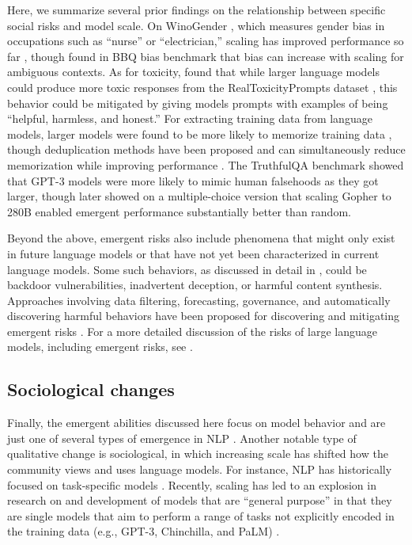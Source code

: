 \documentclass[10pt]{article} %
\begin{document}
Here, we summarize several prior findings on the relationship between specific social risks and model scale.
On WinoGender \citep{rudinger-etal-2017-social}, which measures gender bias in occupations such as ``nurse'' or ``electrician,'' scaling has improved performance so far \citep{du2021glam,chowdhery2022palm}, though \citet{bigbench} found in BBQ bias benchmark \citep{parrish-etal-2022-bbq} that bias can increase with scaling for ambiguous contexts.
As for toxicity, \citet{askell2021general} found that while larger language models could produce more toxic responses from the RealToxicityPrompts dataset \citep{gehman-etal-2020-realtoxicityprompts}, this behavior could be mitigated by giving models prompts with examples of being ``helpful, harmless, and honest.''
For extracting training data from language models, larger models were found to be more likely to memorize training data \citep{carlini2021extracting,carlini2022quantifying}, though deduplication methods have been proposed and can simultaneously reduce memorization while improving performance \citep{kandpal2022deduplicating,lee2021deduplicating}.
The TruthfulQA benchmark \citep{lin2021truthfulqa} showed that GPT-3 models were more likely to mimic human falsehoods as they got larger, though \citet{rae2021scaling} later showed on a multiple-choice version that scaling Gopher to 280B enabled emergent performance substantially better than random.


Beyond the above, emergent risks also include phenomena that might only exist in future language models or that have not yet been characterized in current language models.
Some such behaviors, as discussed in detail in \citet{hendrycks2021unsolved}, could be backdoor vulnerabilities, inadvertent deception, or harmful content synthesis.
Approaches involving data filtering, forecasting, governance, and automatically discovering harmful behaviors have been proposed for discovering and mitigating emergent risks \citep[][\textit{inter alia}]{bender2021dangers,weidinger2021ethical,jacobsrisks,ganguli2022predictability,perez2022red}.
For a more detailed discussion of the risks of large language models, including emergent risks, see \citet{bender2021dangers,jacobsrisks,bommasani2021opportunities,ganguli2022predictability}.



\subsection{Sociological changes}
Finally, the emergent abilities discussed here focus on model behavior and are just one of several types of emergence in NLP \citep{manning2020emergent,teehan2022emergent}.
Another notable type of qualitative change is sociological, in which increasing scale has shifted how the community views and uses language models.
For instance, NLP has historically focused on task-specific models \citep{jurafsky2009speech}.
Recently, scaling has led to an explosion in research on and development of models that are ``general purpose'' in that they are single models that aim to perform a range of tasks not explicitly encoded in the training data (e.g., GPT-3, Chinchilla, and PaLM) \citep{manning2022human}.
\end{document}
